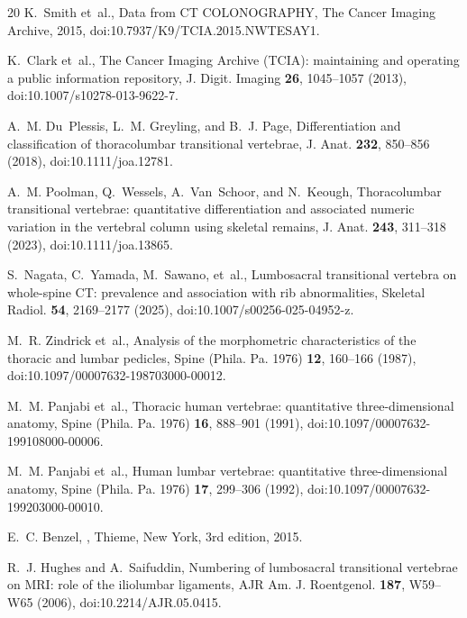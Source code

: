 \documentclass[aapm,mph,amsmath,amssymb,reprint]{revtex4-2}
\begin{document}
\begin{thebibliography}{20}
K.~Smith et~al.,
\newblock Data from {CT COLONOGRAPHY},
\newblock The Cancer Imaging Archive, 2015,
\newblock doi:10.7937/K9/TCIA.2015.NWTESAY1.

K.~Clark et~al.,
\newblock The {Cancer Imaging Archive} ({TCIA}): maintaining and operating a public information repository,
\newblock J. Digit. Imaging {\bf 26}, 1045--1057 (2013),
\newblock doi:10.1007/s10278-013-9622-7.

A.~M. Du~Plessis, L.~M. Greyling, and B.~J. Page,
\newblock Differentiation and classification of thoracolumbar transitional vertebrae,
\newblock J. Anat. {\bf 232}, 850--856 (2018),
\newblock doi:10.1111/joa.12781.

A.~M. Poolman, Q.~Wessels, A.~Van~Schoor, and N.~Keough,
\newblock Thoracolumbar transitional vertebrae: quantitative differentiation and associated numeric variation in the vertebral column using skeletal remains,
\newblock J. Anat. {\bf 243}, 311--318 (2023),
\newblock doi:10.1111/joa.13865.

S.~Nagata, C.~Yamada, M.~Sawano, et~al.,
\newblock Lumbosacral transitional vertebra on whole-spine {CT}: prevalence and association with rib abnormalities,
\newblock Skeletal Radiol. {\bf 54}, 2169--2177 (2025),
\newblock doi:10.1007/s00256-025-04952-z.

M.~R. Zindrick et~al.,
\newblock Analysis of the morphometric characteristics of the thoracic and lumbar pedicles,
\newblock Spine (Phila. Pa. 1976) {\bf 12}, 160--166 (1987),
\newblock doi:10.1097/00007632-198703000-00012.

M.~M. Panjabi et~al.,
\newblock Thoracic human vertebrae: quantitative three-dimensional anatomy,
\newblock Spine (Phila. Pa. 1976) {\bf 16}, 888--901 (1991),
\newblock doi:10.1097/00007632-199108000-00006.

M.~M. Panjabi et~al.,
\newblock Human lumbar vertebrae: quantitative three-dimensional anatomy,
\newblock Spine (Phila. Pa. 1976) {\bf 17}, 299--306 (1992),
\newblock doi:10.1097/00007632-199203000-00010.

E.~C. Benzel,
,
\newblock Thieme, New York, 3rd edition, 2015.

R.~J. Hughes and A.~Saifuddin,
\newblock Numbering of lumbosacral transitional vertebrae on {MRI}: role of the iliolumbar ligaments,
\newblock AJR Am. J. Roentgenol. {\bf 187}, W59--W65 (2006),
\newblock doi:10.2214/AJR.05.0415.


\end{thebibliography}
\end{document}
